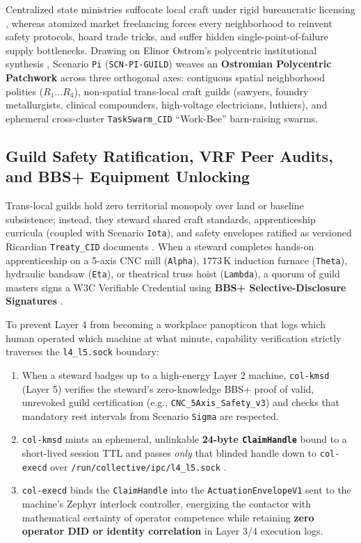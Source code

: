 Centralized state ministries suffocate local craft under rigid bureaucratic licensing \parencite{scott1998},
whereas atomized market freelancing forces every neighborhood to reinvent safety protocols, hoard trade
tricks, and suffer hidden single-point-of-failure supply bottlenecks. Drawing on Elinor Ostrom's
polycentric institutional synthesis \parencite{ostrom1990,ostrom2010}, Scenario \texttt{Pi}
(\texttt{SCN-PI-GUILD}) weaves an \textbf{Ostromian Polycentric Patchwork} across three orthogonal axes:
contiguous spatial neighborhood polities ($R_1 \dots R_4$), non-spatial trans-local craft guilds (sawyers,
foundry metallurgists, clinical compounders, high-voltage electricians, luthiers), and ephemeral
cross-cluster \texttt{TaskSwarm\_CID} ``Work-Bee'' barn-raising swarms.

\subsection{Guild Safety Ratification, VRF Peer Audits, and BBS+ Equipment Unlocking}

Trans-local guilds hold zero territorial monopoly over land or baseline subsistence; instead, they steward
shared craft standards, apprenticeship curricula (coupled with Scenario \texttt{Iota}), and safety
envelopes ratified as versioned Ricardian \texttt{Treaty\_CID} documents \parencite{grigg2004}. When a
steward completes hands-on apprenticeship on a 5-axis CNC mill (\texttt{Alpha}), $1773\,\mathrm{K}$
induction furnace (\texttt{Theta}), hydraulic bandsaw (\texttt{Eta}), or theatrical truss hoist
(\texttt{Lambda}), a quorum of guild masters signs a W3C Verifiable Credential \parencite{w3c2022vc} using
\textbf{BBS+ Selective-Disclosure Signatures} \parencite{camenisch2004signature}.

To prevent Layer 4 from becoming a workplace panopticon that logs which human operated which machine at
what minute, capability verification strictly traverses the \texttt{l4\_l5.sock} boundary:
\begin{enumerate}
    \item When a steward badges up to a high-energy Layer 2 machine, \texttt{col-kmsd} (Layer 5) verifies
    the steward's zero-knowledge BBS+ proof of valid, unrevoked guild certification (e.g.,
    \texttt{CNC\_5Axis\_Safety\_v3}) and checks that mandatory rest intervals from Scenario \texttt{Sigma}
    are respected.
    \item \texttt{col-kmsd} mints an ephemeral, unlinkable \textbf{24-byte \texttt{ClaimHandle}} bound to a
    short-lived session TTL and passes \emph{only} that blinded handle down to \texttt{col-execd} over
    \texttt{/run/collective/ipc/l4\_l5.sock} \parencite{dennis1966programming,miller2006robust}.
    \item \texttt{col-execd} binds the \texttt{ClaimHandle} into the \texttt{ActuationEnvelopeV1} sent to
    the machine's Zephyr interlock controller, energizing the contactor with mathematical certainty of
    operator competence while retaining \textbf{zero operator DID or identity correlation} in Layer 3/4
    execution logs.
\end{enumerate}

